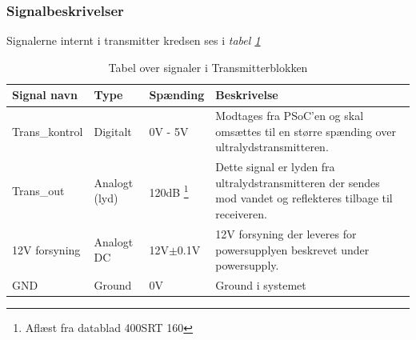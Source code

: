 \subsubsection{Signalbeskrivelser}
Signalerne internt i transmitter kredsen ses i \textit{tabel \ref{table:transmitterblok}}
\begin{table}[H]
\begin{tabular}{|p{3cm}|p{3cm}|p{3cm}|p{4.5cm}|} \hline
\cellcolor[gray]{0.85}Signal navn& \cellcolor[gray]{0.85}Type &\cellcolor[gray]{0.85}Spænding&\cellcolor[gray]{0.85}Beskrivelse\\ \hline
Trans\_kontrol & Digitalt & 0V - 5V & Modtages fra PSoC'en og skal omsættes til en større spænding over ultralydstransmitteren.\\ \hline
Trans\_out & Analogt (lyd) & 120dB \footnote{Aflæst fra datablad 400SRT 160} & Dette signal er lyden fra ultralydstransmitteren der sendes mod vandet og reflekteres tilbage til receiveren. \\ \hline
12V forsyning & Analogt DC & 12V$\pm$0.1V & 12V forsyning der leveres for powersupplyen beskrevet under powersupply.\\ \hline
GND & Ground & 0V & Ground i systemet \\ \hline
\end{tabular}
\caption{Tabel over signaler i Transmitterblokken}
\label{table:transmitterblok}
\end{table}

